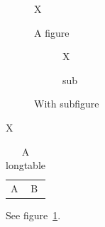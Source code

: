 \documentclass{article}
\begin{document}
\begin{figure}[h]\centering X\caption{A figure}\label{f}\end{figure}
\begin{figure}[h]
  \begin{subfigure}{.4\linewidth}X\caption{sub}\end{subfigure}
  \caption{With subfigure}
\end{figure}
\begin{program}[H]X\caption{A program}\end{program}
\begin{longtable}{ll}
\caption{A longtable}\\
A & B \\
\end{longtable}
See figure~\ref{f}.
\end{document}
